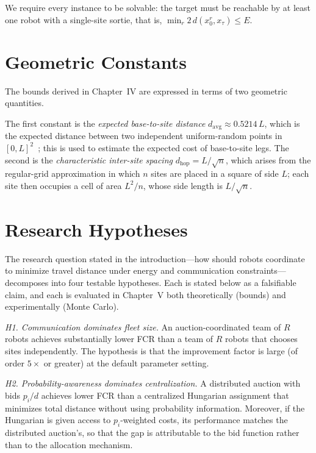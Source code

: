 \begin{doublespacing}
We require every instance to be solvable: the target must be reachable
by at least one robot with a single-site sortie, that is,
$\min_r 2 \, d(x_0^r, x_\tau) \leq E$.

\section{Geometric Constants}

The bounds derived in Chapter~IV are expressed in terms of two
geometric quantities.

The first constant is the \emph{expected base-to-site distance}
$d_{\mathrm{avg}} \approx 0.5214\,L$, which is the expected distance
between two independent uniform-random points in $[0,L]^2$~\citep{Robbins1978};
this is used to estimate the expected cost of base-to-site legs.
The second is the \emph{characteristic inter-site spacing}
$d_{\mathrm{hop}} = L / \sqrt{n}$, which arises from the regular-grid
approximation in which $n$ sites are placed in a square of side $L$;
each site then occupies a cell of area $L^2/n$, whose side length is
$L/\sqrt{n}$.

\section{Research Hypotheses}

The research question stated in the introduction---how should robots
coordinate to minimize travel distance under energy and communication
constraints---decomposes into four testable hypotheses. Each is stated
below as a falsifiable claim, and each is evaluated in Chapter~V both
theoretically (bounds) and experimentally (Monte Carlo).

\emph{H1. Communication dominates fleet size.} An auction-coordinated
team of $R$ robots achieves substantially lower FCR than a team of $R$
robots that chooses sites independently. The hypothesis is that the
improvement factor is large (of order $5\times$ or greater) at the
default parameter setting.

\emph{H2. Probability-awareness dominates centralization.} A
distributed auction with bids $p_i / d$ achieves lower FCR than a
centralized Hungarian assignment that minimizes total distance without
using probability information. Moreover, if the Hungarian is given
access to $p_i$-weighted costs, its performance matches the distributed
auction's, so that the gap is attributable to the bid function rather
than to the allocation mechanism.


\end{doublespacing}
